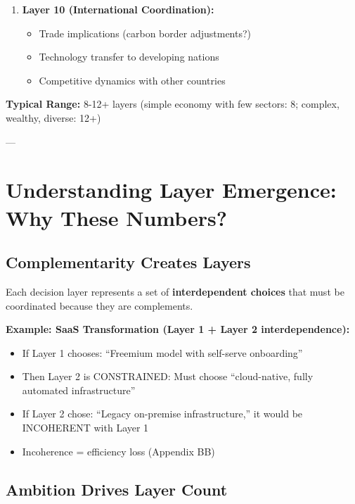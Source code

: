 \documentclass[11pt, a4paper]{article}
\begin{document}
\begin{tcolorbox}[colback=gray!5!white, colframe=gray!75!black, title=Example: National Climate Neutrality (e.g., Carbon Reduction Transformation)]
\begin{enumerate}
    \item \textbf{Layer 10 (International Coordination):}
    \begin{itemize}[nosep]
        \item Trade implications (carbon border adjustments?)
        \item Technology transfer to developing nations
        \item Competitive dynamics with other countries
    \end{itemize}
\end{enumerate}

\textbf{Typical Range:} 8-12+ layers (simple economy with few sectors: 8; complex, wealthy, diverse: 12+)

\end{tcolorbox}

---

\section{Understanding Layer Emergence: Why These Numbers?}

\subsection{Complementarity Creates Layers}

Each decision layer represents a set of \textbf{interdependent choices} that must be coordinated because they are complements.

\textbf{Example: SaaS Transformation (Layer 1 + Layer 2 interdependence):}

\begin{itemize}
    \item If Layer 1 chooses: ``Freemium model with self-serve onboarding''
    \item Then Layer 2 is CONSTRAINED: Must choose ``cloud-native, fully automated infrastructure''
    \item If Layer 2 chose: ``Legacy on-premise infrastructure,'' it would be INCOHERENT with Layer 1
    \item Incoherence = efficiency loss (Appendix BB)
\end{itemize}

\subsection{Ambition Drives Layer Count}
\end{document}

